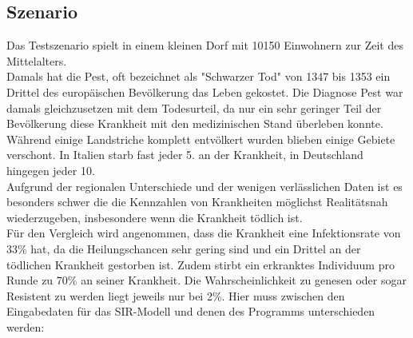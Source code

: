 \documentclass[10pt,twocolumn]{scrartcl}
\begin{document}
\subsection*{Szenario}
Das Testszenario spielt in einem kleinen Dorf mit 10150 Einwohnern zur Zeit des Mittelalters.\\
Damals hat die Pest, oft bezeichnet als "Schwarzer Tod" von 1347 bis 1353 ein Drittel des europäischen Bevölkerung das Leben gekostet. Die Diagnose Pest war damals gleichzusetzen mit dem Todesurteil, da nur ein sehr geringer Teil der Bevölkerung diese Krankheit mit den medizinischen Stand überleben konnte. Während einige Landstriche komplett entvölkert wurden blieben einige Gebiete verschont. In Italien starb fast jeder 5. an der Krankheit, in Deutschland hingegen jeder 10.\\
Aufgrund der regionalen Unterschiede und der wenigen verlässlichen Daten ist es besonders schwer die die Kennzahlen von Krankheiten möglichst Realitätsnah wiederzugeben, insbesondere wenn die Krankheit tödlich ist.\\
Für den Vergleich wird angenommen, dass die Krankheit eine Infektionsrate von 33\% hat, da die Heilungschancen sehr gering sind und ein Drittel an der tödlichen Krankheit gestorben ist.\cite{} Zudem stirbt ein erkranktes Individuum pro Runde zu 70\% an seiner Krankheit. Die Wahrscheinlichkeit zu genesen oder sogar Resistent zu werden liegt jeweils nur bei 2\%.
Hier muss zwischen den Eingabedaten für das SIR-Modell und denen des Programms unterschieden werden:
\end{document}
